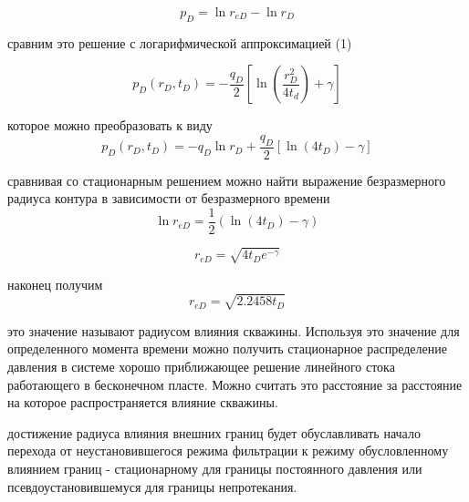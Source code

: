 \documentclass[oneside, openany]{memoir}
\begin{document}
	$$p_D = \ln r_{eD} - \ln r_D $$
	
	сравним это решение с логарифмической аппроксимацией (1)
	
	$$p_D(r_D,t_D) = - \frac{q_D}{2} \left[ \ln \left( \dfrac{ r_D^2}{4t_d} \right) +\gamma \right] $$
	
	которое можно преобразовать к виду
	$$p_D(r_D,t_D) = - q_D \ln r_D  + \frac{q_D}{2} \left[ \ln(4t_D)   -\gamma \right] $$
	
	сравнивая со стационарным решением можно найти выражение безразмерного радиуса контура в зависимости от безразмерного времени
	$$\ln r_{eD} = \frac{1}{2}(\ln(4t_D)-\gamma) $$
	
	$$r_{eD} =  \sqrt { 4t_D e^{-\gamma} }  $$
	
	наконец получим
	$$r_{eD} = \sqrt {2.2458 t_D} $$
	
	это значение называют радиусом влияния скважины. Используя это значение для определенного момента времени можно получить стационарное распределение давления в системе хорошо приближающее решение линейного стока работающего в бесконечном пласте. Можно считать это расстояние за расстояние на которое распространяется влияние скважины.
	
	достижение радиуса влияния внешних границ будет обуславливать начало перехода от неустановившегося режима фильтрации к режиму обусловленному влиянием границ - стационарному для границы постоянного давления или псевдоустановившемуся для границы непротекания.
	
	\printbibliography
\end{document}
